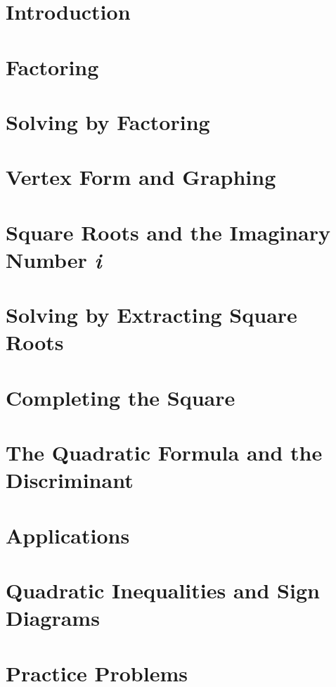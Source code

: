 \section{Introduction}

\newpage

\section{Factoring}

\newpage


\newpage


\newpage


\newpage

\section{Solving by Factoring}

\newpage

\section{Vertex Form and Graphing}

\newpage

\newpage

\section{Square Roots and the Imaginary Number \textit{i}}

\newpage

\section{Solving by Extracting Square Roots}

\newpage

\section{Completing the Square}

\newpage

\section{The Quadratic Formula and the Discriminant}

\newpage

\section{Applications}

\newpage

\section{Quadratic Inequalities and Sign Diagrams}

\newpage

\section{Practice Problems}

\newpage
\closegraphsfile